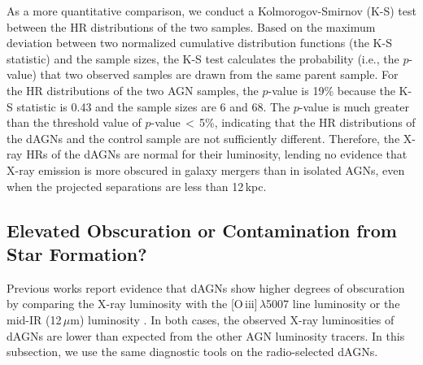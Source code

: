\documentclass[iop,revtex4,twocolumn,apj,numberedappendix,appendixfloats]{emulateapj}
\newcommand{\um}{$\mu$m}
\begin{document}
As a more quantitative comparison, we conduct a Kolmorogov-Smirnov (K-S) test between the HR distributions of the two samples. Based on the maximum deviation between two normalized cumulative distribution functions (the K-S statistic) and the sample sizes, the K-S test calculates the probability (i.e., the $p$-value) that two observed samples are drawn from the same parent sample. For the HR distributions of the two AGN samples, the $p$-value is 19\% because the K-S statistic is 0.43 and the sample sizes are 6 and 68. The $p$-value is much greater than the threshold value of $p$-value\,$<$\,5\%, indicating that the HR distributions of the dAGNs and the control sample are not sufficiently different. Therefore, the X-ray HRs of the dAGNs are normal for their luminosity, lending no evidence that X-ray emission is more obscured in galaxy mergers than in isolated AGNs, even when the projected separations are less than 12\,kpc.

\subsection{Elevated Obscuration or Contamination from Star Formation?} \label{sec:deficit}

Previous works report evidence that dAGNs show higher degrees of obscuration by comparing the X-ray luminosity with the [O\,{\sc iii}]\,$\lambda$5007 line luminosity \citep{Liu13a} or the mid-IR (12\,\um) luminosity \citep{Satyapal17}. In both cases, the observed X-ray luminosities of dAGNs are lower than expected from the other AGN luminosity tracers. In this subsection, we use the same diagnostic tools on the radio-selected dAGNs. 
\end{document}
